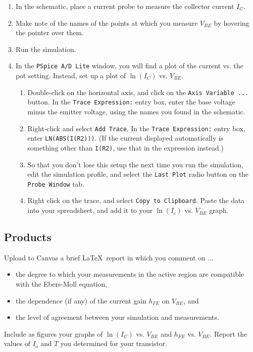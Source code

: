 \documentclass[11pt]{article}
\begin{document}
\begin{enumerate}
\item In the schematic, place a current probe to measure the collector
  current $I_C$.

\item Make note of the names of the points at which you measure
  $V_{BE}$ by hovering the pointer over them.

\item Run the simulation.

\item In the \texttt{PSpice A/D Lite} window, you will find a plot of
  the current vs. the pot setting. Instead, set up a plot of
  $\ln(I_C)$ vs. $V_{BE}$.
  \begin{enumerate}
  \item Double-click on the horizontal axis, and click on the
    \texttt{Axis Variable ...} button. In the \texttt{Trace
      Expression:} entry box, enter the base voltage minus the emitter
    voltage, using the names you found in the schematic.
  \item Right-click and select \texttt{Add Trace}. In the \texttt{Trace
      Expression:} entry box, enter \texttt{LN(ABS(I(R2)))}. (If the
    current displayed automatically is something other than
    \texttt{I(R2)}, use that in the expression instead.)
  \item So that you don't lose this setup the next time you run the
    simulation, edit the simulation profile, and select the
    \texttt{Last Plot} radio button on the \texttt{Probe Window} tab.
  \item Right click on the trace, and select \texttt{Copy to
    Clipboard}. Paste the data into your spreadsheet, and add it to
    your $\ln(I_c)$ vs. $V_{BE}$ graph.
  \end{enumerate}
\end{enumerate}

\subsection*{Products}

Upload to Canvas a brief \LaTeX\ report in which you comment on ...
\begin{itemize}
  \item the degree to which your measurements in the active region are
    compatible with the Ebers-Moll equation,
  \item the dependence (if any) of the current gain $h_{FE}$ on
    $V_{BE}$, and
  \item the level of agreement between your simulation and
    measurements.
\end{itemize}
Include as figures your graphs of $\ln(I_C)$ vs. $V_{BE}$ and $h_{FE}$
vs. $V_{BE}$. Report the values of $I_o$ and $T$ you determined for
your transistor.
\end{document}
